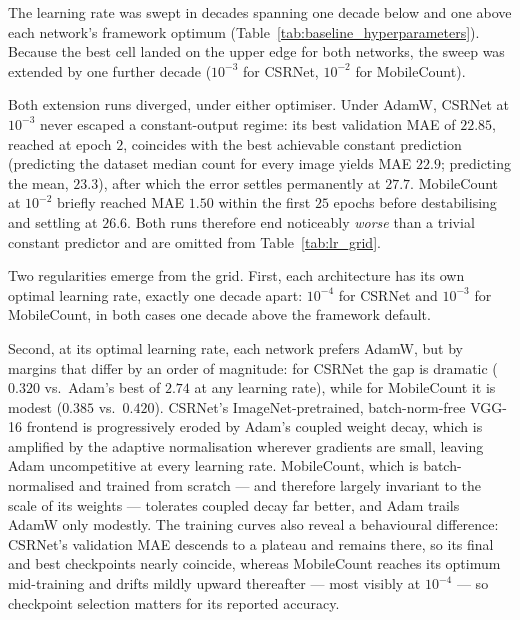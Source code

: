 \documentclass[conference]{IEEEtran}
\begin{document}
The learning rate was swept in decades spanning one decade below and one above each network's framework optimum
(Table~\ref{tab:baseline_hyperparameters}). Because the best cell
landed on the upper edge for both networks, the sweep was extended by
one further decade ($10^{-3}$ for CSRNet, $10^{-2}$ for MobileCount).

Both extension runs diverged, under either optimiser. Under AdamW, CSRNet at
$10^{-3}$ never escaped a constant-output regime: its best validation MAE of
$22.85$, reached at epoch $2$, coincides with the best achievable constant
prediction (predicting the dataset median count for every image yields MAE
$22.9$; predicting the mean, $23.3$), after which the error settles permanently
at $27.7$. MobileCount at $10^{-2}$ briefly reached MAE $1.50$ within the first
$25$ epochs before destabilising and settling at $26.6$. Both runs therefore end
noticeably \emph{worse} than a trivial constant predictor and are omitted from
Table~\ref{tab:lr_grid}.

Two regularities emerge from the grid. First, each architecture has its own optimal learning rate, exactly one decade apart: $10^{-4}$ for CSRNet and $10^{-3}$ for MobileCount, in both cases one decade above
the framework default.

Second, at its optimal learning rate, each network prefers
AdamW, but by margins that differ by an order of magnitude: for
CSRNet the gap is dramatic ($0.320$ vs.\ Adam's best of $2.74$ at any
learning rate), while for MobileCount it is modest ($0.385$ vs.\
$0.420$). CSRNet's ImageNet-pretrained, batch-norm-free VGG-16 frontend is progressively eroded by Adam's coupled weight decay, which is amplified by the adaptive normalisation wherever gradients are small, leaving Adam uncompetitive at every learning rate. MobileCount, which is batch-normalised and trained from
scratch — and therefore largely invariant to the scale of its weights
— tolerates coupled decay far better, and Adam trails AdamW only modestly.
The training curves also reveal a behavioural difference: CSRNet's validation MAE descends to a plateau and remains there, so its final and best checkpoints nearly coincide, whereas MobileCount reaches its
optimum mid-training and drifts mildly upward thereafter — most
visibly at $10^{-4}$ — so checkpoint selection matters for its
reported accuracy.
\end{document}
